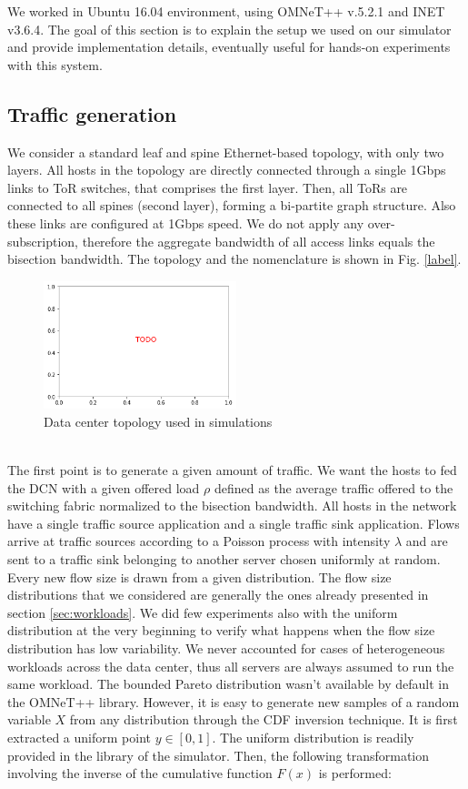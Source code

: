 We worked in Ubuntu 16.04 environment, using OMNeT++ v.5.2.1 and INET v3.6.4. 
The goal of this section is to explain the setup we used on our simulator and provide implementation details, eventually useful for hands-on experiments with this system. 
\subsection{Traffic generation}
We consider a standard leaf and spine Ethernet-based topology, with only two layers. All hosts in the topology are directly connected through a single 1Gbps links to ToR switches, that comprises the first layer. Then, all ToRs are connected to all spines (second layer), forming a bi-partite graph structure. Also these links are configured at 1Gbps speed. We do not apply any over-subscription, therefore the aggregate bandwidth of all access links equals the bisection bandwidth. The topology and the nomenclature is shown in Fig. \ref{label}.
\begin{figure}
	\centering
	\includegraphics[width=0.5\textwidth]{Chapter3/Figures/todored}
	\caption{Data center topology used in simulations}
\end{figure}
\\The first point is to generate a given amount of traffic. We want the hosts to fed the DCN with a given offered load $\rho$ defined as the average traffic offered to the switching fabric normalized to the bisection bandwidth. All hosts in the network have a single traffic source application and a single traffic sink application. Flows arrive at traffic sources according to a Poisson process with intensity $\lambda$ and are sent to a traffic sink belonging to another server chosen uniformly at random. Every new flow size is drawn from a given distribution. The flow size distributions that we considered are generally the ones already presented in section \ref{sec:workloads}. We did few experiments also with the uniform distribution at the very beginning to verify what happens when the flow size distribution has low variability. We never accounted for cases of heterogeneous workloads across the data center, thus all servers are always assumed to run the same workload. The bounded Pareto distribution wasn't available by default in the OMNeT++ library. However, it is easy to generate new samples of a random variable $X$ from any distribution through the CDF inversion technique. It is first extracted a uniform point $y \in [0,1]$. The uniform distribution is readily provided in the library of the simulator. Then, the following transformation involving the inverse of the cumulative function $F(x)$ is performed:

